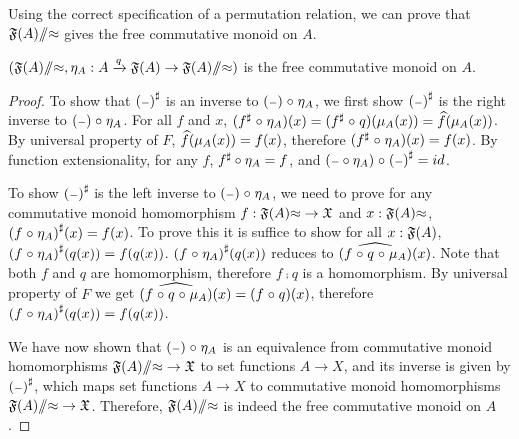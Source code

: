 Using the correct specification of a permutation relation, we can prove that ${\mathfrak{F}(A)}{\sslash}{\approx}$ gives the free
commutative monoid on $A$.


\begin{proposition}
    $({\mathfrak{F}(A)}{\sslash}{\approx}, \eta_A : A \xrightarrow{q} \mathfrak{F}(A) \to {\mathfrak{F}(A)}{\sslash}{\approx})$
    is the free commutative monoid on $A$.
\end{proposition}

\begin{proof}
    To show that $\ext{(\blank)}$ is an inverse to $(\blank) \comp \eta_A$,
    we first show $\ext{(\blank)}$ is the right inverse to $(\blank) \comp \eta_A$.
    For all $f$ and $x$, $({f}^{\sharp} \mathrel{\circ} \eta_A)(x) = ({f}^{\sharp} \mathrel{\circ} q)(\mu_A(x)) = \widehat{f}(\mu_A(x))$.
    By universal property of $F$, $\widehat{f}(\mu_A(x)) = f(x)$, therefore $({f}^{\sharp} \mathrel{\circ} \eta_A)(x) = f(x)$.
    By function extensionality, for any $f$, ${f}^{\sharp} \circ \eta_A = f$,
    and $(\blank \circ \eta_A) \comp \ext{(\blank)} = id$.

    To show $\ext{(\blank)}$ is the left inverse to $(\blank) \comp \eta_A$, we need to prove
    for any commutative monoid homomorphism $f : {\mathfrak{F}(A)}{\approx} \to \mathfrak{X}$ and $x : {\mathfrak{F}(A)}{\approx}$,
    ${(f \mathrel{\circ} \eta_A)}^{\sharp}(x) = f(x)$. To prove this it is suffice to show for all $x : \mathfrak{F}(A)$,
    ${(f \mathrel{\circ} \eta_A)}^{\sharp}(q(x)) = f(q(x))$.
    ${(f \mathrel{\circ} \eta_A)}^{\sharp}(q(x))$ reduces to $\widehat{(f \mathrel{\circ} q \mathrel{\circ} \mu_A)}(x)$.
    Note that both $f$ and $q$ are homomorphism, therefore $f \comp q$ is a homomorphism. By
    universal property of $F$ we get $\widehat{(f \mathrel{\circ} q \mathrel{\circ} \mu_A)}(x) = (f \mathrel{\circ} q)(x)$,
    therefore ${(f \mathrel{\circ} \eta_A)}^{\sharp}(q(x)) = f(q(x))$.

    We have now shown that $(\blank) \comp \eta_A$ is an equivalence from
    commutative monoid homomorphisms ${\mathfrak{F}(A)}{\sslash}{\approx} \to \mathfrak{X}$
    to set functions $A \to X$, and its inverse is given by $\ext{(\blank)}$, which maps set
    functions $A \to X$ to commutative monoid homomorphisms ${\mathfrak{F}(A)}{\sslash}{\approx} \to \mathfrak{X}$.
    Therefore, ${\mathfrak{F}(A)}{\sslash}{\approx}$ is indeed the free commutative monoid on $A$.
\end{proof}


